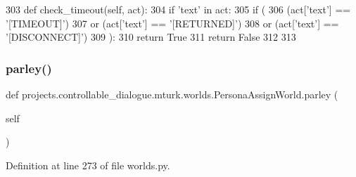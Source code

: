 \begin{DoxyCode}
303     \textcolor{keyword}{def }check\_timeout(self, act):
304         \textcolor{keywordflow}{if} \textcolor{stringliteral}{'text'} \textcolor{keywordflow}{in} act:
305             \textcolor{keywordflow}{if} (
306                 (act[\textcolor{stringliteral}{'text'}] == \textcolor{stringliteral}{'[TIMEOUT]'})
307                 \textcolor{keywordflow}{or} (act[\textcolor{stringliteral}{'text'}] == \textcolor{stringliteral}{'[RETURNED]'})
308                 \textcolor{keywordflow}{or} (act[\textcolor{stringliteral}{'text'}] == \textcolor{stringliteral}{'[DISCONNECT]'})
309             ):
310                 \textcolor{keywordflow}{return} \textcolor{keyword}{True}
311         \textcolor{keywordflow}{return} \textcolor{keyword}{False}
312 
313 
\end{DoxyCode}
\mbox{\label{classprojects_1_1controllable__dialogue_1_1mturk_1_1worlds_1_1PersonaAssignWorld_a6c8b0be29e30f5531e3c3f2dfea93966}} 
\subsubsection{\texorpdfstring{parley()}{parley()}}
{\footnotesize\ttfamily def projects.\+controllable\+\_\+dialogue.\+mturk.\+worlds.\+Persona\+Assign\+World.\+parley (\begin{DoxyParamCaption}\item[{}]{self }\end{DoxyParamCaption})}



Definition at line 273 of file worlds.\+py.


